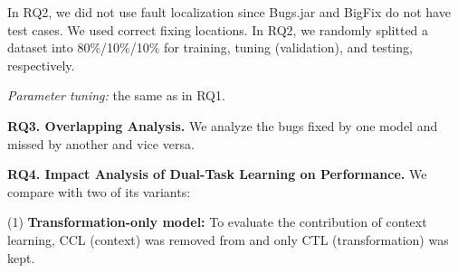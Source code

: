 



In RQ2, we did not use fault localization since Bugs.jar and
BigFix do not have test cases. We used correct fixing locations.  In
RQ2, we randomly splitted a dataset into
80\%/10\%/10\% for training, tuning (validation), and testing,
respectively.


{\em Parameter tuning:} the same as in RQ1.



\vspace{2pt} {\bf RQ3. Overlapping Analysis.} We analyze the bugs
fixed by one model and missed by another and vice versa.


\vspace{2pt}
{\bf RQ4. Impact Analysis of Dual-Task Learning on Performance.}
We compare {\tool} with two of its variants:

(1) \textbf{Transformation-only model:} To evaluate the contribution of context learning, CCL (context)
was removed from {\tool} and only CTL (transformation) was kept.

